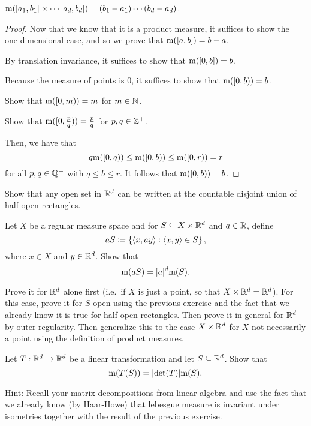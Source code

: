 \begin{prp}
$\mathrm{m} ([a_1,b_1]\times \cdots [a_d,b_d])=(b_1-a_1)\cdots (b_d-a_d)$.
\begin{proof}
Now that we know that it is a product measure, it suffices to show the one-dimensional case, and so we prove that $\mathrm{m} ([a,b])=b-a$.

By translation invariance, it suffices to show that $\mathrm{m} ([0,b])=b$.

Because the measure of points is $0$, it suffices to show that $\mathrm{m} ([0,b))=b$.

\begin{exr}
Show that $\mathrm{m} ([0,m))=m$ for $m\in \mathbb{N}$.
\end{exr}
\begin{exr}
Show that $\mathrm{m} ([0,\frac{p}{q}))=\frac{p}{q}$ for $p,q\in \mathbb{Z} ^+$.
\end{exr}
Then, we have that
\begin{equation}
q\mathrm{m} ([0,q)) \leq \mathrm{m} ([0,b))\leq \mathrm{m} ([0,r))=r
\end{equation}
for all $p,q\in \mathbb{Q} ^+$ with $q\leq b\leq r$.  It follows that $\mathrm{m} ([0,b))=b$.
\end{proof}
\end{prp}
\begin{exr}
Show that any open set in $\mathbb{R} ^d$ can be written at the countable disjoint union of half-open rectangles.
\end{exr}
\begin{exr}\label{exr5.2.28}
Let $X$ be a regular measure space and for $S\subseteq X\times \mathbb{R} ^d$ and $a\in \mathbb{R}$, define
\begin{equation}
aS\coloneqq \left\{ \langle x,ay\rangle:\langle x,y\rangle\in S\right\} ,
\end{equation}
where $x\in X$ and $y\in \mathbb{R} ^d$.  Show that
\begin{equation}
\mathrm{m} (aS)=\lvert a\rvert^d\mathrm{m} (S).
\end{equation}
\begin{rmk}
Prove it for $\mathbb{R} ^d$ alone first (i.e.~if $X$ is just a point, so that $X\times \mathbb{R} ^d=\mathbb{R} ^d$).  For this case, prove it for $S$ open using the previous exercise and the fact that we already know it is true for half-open rectangles.  Then prove it in general for $\mathbb{R} ^d$ by outer-regularity.  Then generalize this to the case $X\times \mathbb{R} ^d$ for $X$ not-necessarily a point using the definition of product measures.
\end{rmk}
\end{exr}
\begin{exr}
Let $T:\mathbb{R} ^d\rightarrow \mathbb{R} ^d$ be a linear transformation and let $S\subseteq \mathbb{R} ^d$.  Show that
\begin{equation}
\mathrm{m} (T(S))=\lvert\det (T)\rvert\mathrm{m} (S).
\end{equation}
\begin{rmk}
Hint:  Recall your matrix decompositions from linear algebra and use the fact that we already know (by Haar-Howe) that lebesgue measure is invariant under isometries together with the result of the previous exercise.
\end{rmk}
\end{exr}

